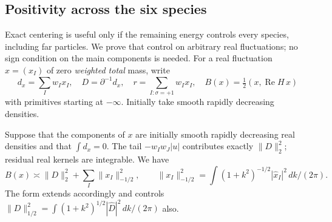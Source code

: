 \subsection{Positivity across the six species}

Exact centering is useful only if the remaining energy controls every
species, including far particles. We prove that control on arbitrary
real fluctuations; no sign condition on the main components is needed.
For a real fluctuation \(x=(x_I)\) of zero \emph{weighted total} mass, write
\[
 d_x=\sum_I w_I x_I,\quad D=\partial^{-1} d_x,\quad r=\sum_{I:\sigma=+1} w_I x_I,\quad
 B(x)=\tfrac12(x,\operatorname{Re}H\,x)
\]
with primitives starting at \(-\infty\). Initially take smooth rapidly decreasing densities.

\begin{lemma}\label{lem:03-coercivity}\label{E:coercivity}
Suppose that the components of \(x\) are initially smooth rapidly decreasing real densities and that \(\int d_x=0\). The tail \(-w_Iw_J|u|\) contributes exactly \(\|D\|_2^2\); residual real kernels are integrable. We have
\[
 B(x)\asymp\|D\|_2^2+\sum_I\|x_I\|_{-1/2}^2,\qquad
 \|x_I\|_{-1/2}^2=\int(1+k^2)^{-1/2}|\widehat x_I|^2\,dk/(2\pi).
\]
The form extends accordingly and controls \(\|D\|_{1/2}^2=\int (1+k^2)^{1/2}|\widehat D|^2\,dk/(2\pi)\) also.

\end{lemma}
